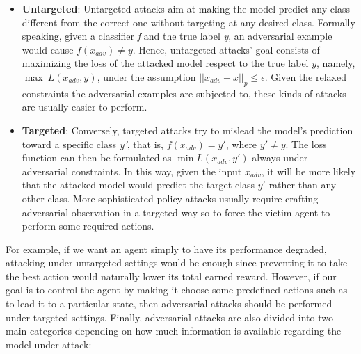 \begin{itemize}
    \item \textbf{Untargeted}: Untargeted attacks aim at making the model predict any class different from the correct one without targeting at any desired class. Formally speaking, given a classifier \textit{f} and the true label \textit{y}, an adversarial example would cause \(f(x_{adv})\neq y\). Hence, untargeted attacks' goal consists of maximizing the loss of the attacked model respect to the true label \(y\), namely, \(\max \: L(x_{adv}, y)\), under the assumption \(||x_{adv}-x||_p\leq \epsilon\). Given the relaxed constraints the adversarial examples are subjected to, these kinds of attacks are usually easier to perform.
    \item \textbf{Targeted}: Conversely, targeted attacks try to mislead the model's prediction toward a specific class \textit{y'}, that is, \(f(x_{adv})=y'\), where \(y'\neq y\). The loss function can then be formulated as \(\min L(x_{adv}, y')\) always under adversarial constraints. In this way, given the input \(x_{adv}\), it will be more likely that the attacked model would predict the target class \(y'\) rather than any other class. More sophisticated policy attacks usually require crafting adversarial observation in a targeted way so to force the victim agent to perform some required actions.
\end{itemize}
For example, if we want an agent simply to have its performance degraded, attacking under untargeted settings would be enough since preventing it to take the best action would naturally lower its total earned reward. However, if our goal is to control the agent by making it choose some predefined actions such as to lead it to a particular state, then adversarial attacks should be performed under targeted settings. Finally, adversarial attacks are also divided into two main categories depending on how much information is available regarding the model under attack:
